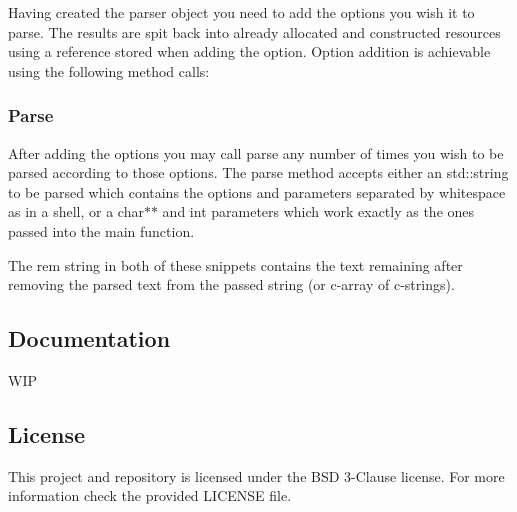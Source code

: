 Having created the parser object you need to add the options you wish it to parse. The results are spit back into already allocated and constructed resources using a reference stored when adding the option. Option addition is achievable using the following method calls\+:
\begin{DoxyCode}{0}
\DoxyCodeLine{}
\DoxyCodeLine{}
\end{DoxyCode}


\subsubsection*{Parse}

After adding the options you may call parse any number of times you wish to be parsed according to those options. The parse method accepts either an std\+::string to be parsed which contains the options and parameters separated by whitespace as in a shell, or a char$\ast$$\ast$ and int parameters which work exactly as the ones passed into the main function.
\begin{DoxyCode}{0}
\DoxyCodeLine{\}}
\end{DoxyCode}

\begin{DoxyCode}{0}
\end{DoxyCode}
The {\ttfamily rem} string in both of these snippets contains the text remaining after removing the parsed text from the passed string (or c-\/array of c-\/strings).

\subsection*{Documentation}

W\+IP

\subsection*{License}

This project and repository is licensed under the B\+SD 3-\/Clause license. For more information check the provided {\ttfamily L\+I\+C\+E\+N\+SE} file.
